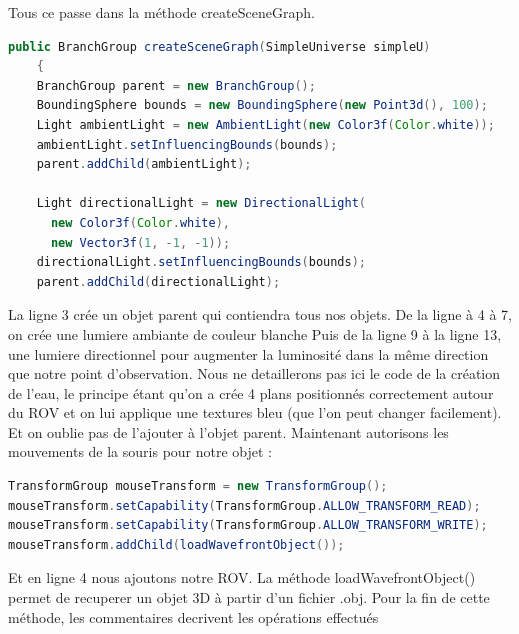 \documentclass[a4paper,11pt]{report}
\begin{document}
		\newline Tous ce passe dans la méthode createSceneGraph.
		\begin{lstlisting}[language=java]
public BranchGroup createSceneGraph(SimpleUniverse simpleU) 
	{
    BranchGroup parent = new BranchGroup();
    BoundingSphere bounds = new BoundingSphere(new Point3d(), 100);
    Light ambientLight = new AmbientLight(new Color3f(Color.white));
    ambientLight.setInfluencingBounds(bounds);
    parent.addChild(ambientLight);
		
    Light directionalLight = new DirectionalLight(
      new Color3f(Color.white),
      new Vector3f(1, -1, -1));
    directionalLight.setInfluencingBounds(bounds);
    parent.addChild(directionalLight);
		\end{lstlisting}
		La ligne 3 crée un objet parent qui contiendra tous nos objets.
		\newline De la ligne à 4 à 7, on crée une lumiere ambiante de couleur blanche
		\newline Puis de la ligne 9 à la ligne 13, une lumiere directionnel pour augmenter la luminosité dans la même direction que notre point d'observation.
		\newline Nous ne detaillerons pas ici le code de la création de l'eau, le principe étant qu'on a crée 4 plans positionnés correctement autour du ROV et on lui applique une textures bleu (que l'on peut changer facilement). Et on oublie pas de l'ajouter à l'objet parent.
		\newline Maintenant autorisons les mouvements de la souris pour notre objet :
		\begin{lstlisting}[language=java]
TransformGroup mouseTransform = new TransformGroup();
mouseTransform.setCapability(TransformGroup.ALLOW_TRANSFORM_READ);
mouseTransform.setCapability(TransformGroup.ALLOW_TRANSFORM_WRITE);
mouseTransform.addChild(loadWavefrontObject());
		\end{lstlisting}
		Et en ligne 4 nous ajoutons notre ROV. La méthode loadWavefrontObject() permet de recuperer un objet 3D à partir d'un fichier .obj.
		\newline Pour la fin de cette méthode, les commentaires decrivent les opérations effectués
\end{document}
